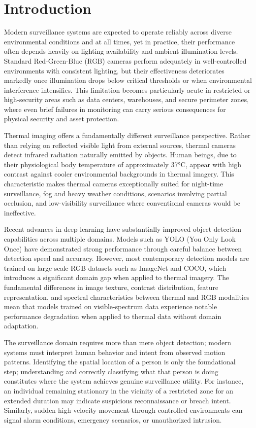\documentclass[conference]{IEEEtran}
\begin{document}
\section{Introduction}

Modern surveillance systems are expected to operate reliably across diverse environmental conditions and at all times, yet in practice, their performance often depends heavily on lighting availability and ambient illumination levels. Standard Red-Green-Blue (RGB) cameras perform adequately in well-controlled environments with consistent lighting, but their effectiveness deteriorates markedly once illumination drops below critical thresholds or when environmental interference intensifies. This limitation becomes particularly acute in restricted or high-security areas such as data centers, warehouses, and secure perimeter zones, where even brief failures in monitoring can carry serious consequences for physical security and asset protection.

Thermal imaging offers a fundamentally different surveillance perspective. Rather than relying on reflected visible light from external sources, thermal cameras detect infrared radiation naturally emitted by objects. Human beings, due to their physiological body temperature of approximately 37°C, appear with high contrast against cooler environmental backgrounds in thermal imagery. This characteristic makes thermal cameras exceptionally suited for night-time surveillance, fog and heavy weather conditions, scenarios involving partial occlusion, and low-visibility surveillance where conventional cameras would be ineffective.

Recent advances in deep learning have substantially improved object detection capabilities across multiple domains. Models such as YOLO (You Only Look Once) have demonstrated strong performance through careful balance between detection speed and accuracy. However, most contemporary detection models are trained on large-scale RGB datasets such as ImageNet and COCO, which introduces a significant domain gap when applied to thermal imagery. The fundamental differences in image texture, contrast distribution, feature representation, and spectral characteristics between thermal and RGB modalities mean that models trained on visible-spectrum data experience notable performance degradation when applied to thermal data without domain adaptation.

The surveillance domain requires more than mere object detection; modern systems must interpret human behavior and intent from observed motion patterns. Identifying the spatial location of a person is only the foundational step; understanding and correctly classifying what that person is doing constitutes where the system achieves genuine surveillance utility. For instance, an individual remaining stationary in the vicinity of a restricted zone for an extended duration may indicate suspicious reconnaissance or breach intent. Similarly, sudden high-velocity movement through controlled environments can signal alarm conditions, emergency scenarios, or unauthorized intrusion.
\end{document}
